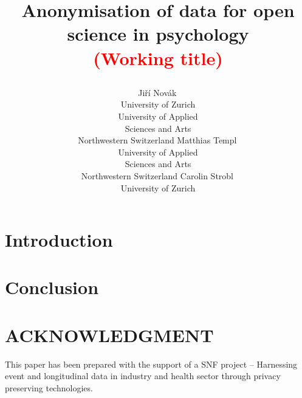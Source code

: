 \documentclass[article]{ajs}
\title{Anonymisation of data for open science in psychology \\
\textcolor{red}{(Working title)} 

}
\author{
		Jiří Novák\,\orcidlink{0000-0003-0715-4769}\\ 
        University of Zurich \\
        University of Applied \\ Sciences and Arts \\ Northwestern Switzerland \And 
		Matthias Templ\,\orcidlink{0000-0002-8638-5276}\\ University of Applied \\ Sciences and Arts \\ Northwestern Switzerland \And 
        Carolin Strobl\,\orcidlink{0000-0003-0952-3230}\\ University of Zurich
        }
\begin{document}
\section{Introduction}



\section{Conclusion}


\section{ACKNOWLEDGMENT}

This paper has been prepared with the support of a SNF project – Harnessing event and longitudinal data in industry and health sector through privacy preserving technologies. 


%

\end{document}
